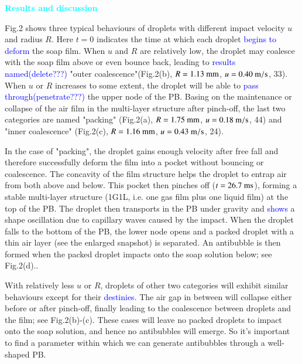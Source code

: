 \documentclass[%
 preprint,
 superscriptaddress,
 amsmath,amssymb,
 aps, prl,
]{revtex4-2}
\begin{document}
\textcolor{cyan}{\textbf{Results and discussion}}\par
    {\color{black}
    Fig.2 shows three typical behaviours of droplets with different impact velocity $u$ and radius $R$. Here $t = 0$ indicates the time at which each droplet \textcolor{blue}{begins to deform} the soap film. When $u$ and $R$ are relatively low, the droplet may coalesce with the soap film above or even bounce back, leading to \textcolor{blue}{results named(delete???)} "outer coalescence"(Fig.2(b), $R = 1.13\ {\rm mm}$, $u = 0.40\ {\rm m/s}$, 33). When $u$ or $R$ increases to some extent, the droplet will be able to \textcolor{blue}{pass through(penetrate???)} the upper node of the PB. Basing on the maintenance or collapse of the air film in the multi-layer structure after pinch-off, the last two categories are named "packing" (Fig.2(a), $ R = 1.75\ {\rm mm}$, $u = 0.18\ {\rm m/s}$,    44) and "inner coalescence" (Fig.2(c), $R = 1.16\ {\rm mm}$, $u = 0.43\ {\rm m/s}$, 24).\par
    In the case of "packing", the droplet gains enough velocity after free fall and therefore successfully deform the film into a pocket without bouncing or coalescence. The concavity of the film structure helps the droplet to entrap air from both above and below. This pocket then pinches off ($ t = 26.7\ {\rm ms}$), forming a stable multi-layer structure (1G1L, i.e. one gas film plus one liquid film)\cite{} at the top of the PB. The droplet then transports in the PB under gravity and \textcolor{blue}{shows} a shape oscillation due to capillary waves caused by the impact. When the droplet falls to the bottom of the PB, the lower node opens and a packed droplet with a thin air layer (see the enlarged snapshot) is separated. An antibubble is then formed when the packed droplet impacts onto the soap solution below; see Fig.2(d).\cite{}.\par %
    With relatively less $u$ or $R$, droplets of other two categories will exhibit similar behaviours except for their \textcolor{blue}{destinies}. The air gap in between will collapse either before or after pinch-off, finally leading to the coalescence between droplets and the film; see Fig.2(b)-(c). These cases will leave no packed droplets to impact onto the soap solution, and hence no antibubbles will emerge. So it's important to find a parameter within which we can generate antibubbles through a well-shaped PB.
}
\end{document}
